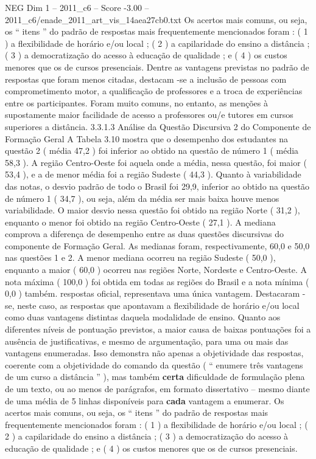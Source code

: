 \begin{textsample}{NEG Dim 1 – 2011\_c6 – Score -3.00 – 2011\_c6/enade\_2011\_art\_vis\_14aea27cb0.txt}
Os acertos mais comuns, ou seja, os “ itens ” do padrão de respostas mais frequentemente mencionados foram : ( 1 ) a flexibilidade de horário e/ou local ; ( 2 ) a capilaridade do ensino a distância ; ( 3 ) a democratização do acesso à educação de qualidade ; e ( 4 ) os custos menores que os de cursos presenciais.
Dentre as vantagens previstas no padrão de respostas que foram menos citadas, destacam -se a inclusão de pessoas com comprometimento motor, a qualificação de professores e a troca de experiências entre os participantes.
Foram muito comuns, no entanto, as menções à supostamente maior facilidade de acesso a professores ou/e tutores em cursos superiores a distância. 3.3.1.3 Análise da Questão Discursiva 2 do Componente de Formação Geral A Tabela 3.10 mostra que o desempenho dos estudantes na questão 2 ( média 47,2 ) foi inferior ao obtido na questão de número 1 ( média 58,3 ).
A região Centro-Oeste foi aquela onde a média, nessa questão, foi maior ( 53,4 ), e a de menor média foi a região Sudeste ( 44,3 ).
Quanto à variabilidade das notas, o desvio padrão de todo o Brasil foi 29,9, inferior ao obtido na questão de número 1 ( 34,7 ), ou seja, além da média ser mais baixa houve menos variabilidade.
O maior desvio nessa questão foi obtido na região Norte ( 31,2 ), enquanto o menor foi obtido na região Centro-Oeste ( 27,1 ).
A mediana comprova a diferença de desempenho entre as duas questões discursivas do componente de Formação Geral.
As medianas foram, respectivamente, 60,0 e 50,0 nas questões 1 e 2.
A menor mediana ocorreu na região Sudeste ( 50,0 ), enquanto a maior ( 60,0 ) ocorreu nas regiões Norte, Nordeste e Centro-Oeste.
A nota máxima ( 100,0 ) foi obtida em todas as regiões do Brasil e a nota mínima ( 0,0 ) também. respostas oficial, representava uma única vantagem.
Destacaram -se, neste caso, as respostas que apontavam a flexibilidade de horário e/ou local como duas vantagens distintas daquela modalidade de ensino.
Quanto aos diferentes níveis de pontuação previstos, a maior causa de baixas pontuações foi a ausência de justificativas, e mesmo de argumentação, para uma ou mais das vantagens enumeradas.
Isso demonstra não apenas a objetividade das respostas, coerente com a objetividade do comando da questão ( “ enumere três vantagens de um curso a distância ” ), mas também \textbf{certa} dificuldade de formulação plena de um texto, ou ao menos de parágrafos, em formato dissertativo – mesmo diante de uma média de 5 linhas disponíveis para \textbf{cada} vantagem a enumerar.
Os acertos mais comuns, ou seja, os “ itens ” do padrão de respostas mais frequentemente mencionados foram : ( 1 ) a flexibilidade de horário e/ou local ; ( 2 ) a capilaridade do ensino a distância ; ( 3 ) a democratização do acesso à educação de qualidade ; e ( 4 ) os custos menores que os de cursos presenciais.

\end{textsample}
